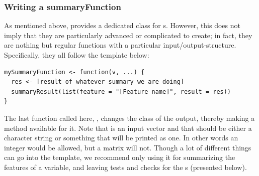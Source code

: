 \documentclass[article,shortnames]{jss}
\newcommand{\hl}[1]{\textcolor{magenta}{#1}}
\begin{document}

\subsubsection{Writing a summaryFunction}
As mentioned above,  provides a dedicated class for
s. However, this does not imply that they are
particularly advanced or complicated to create; in fact, they are
nothing but regular functions with a particular
input/output-structure. Specifically, they all follow the template
below:
\begin{Verbatim}
mySummaryFunction <- function(v, ...) {
  res <- [result of whatever summary we are doing]
  summaryResult(list(feature = "[Feature name]", result = res))
}
\end{Verbatim}
The last function called here, , changes the
class of the output, thereby making a  method available
for it.  Note that  is an input vector and that 
should be either a character string or something that will be printed
as one. In other words an integer would be allowed, but a matrix will
not. Though a lot of different things can go into the
 template, we recommend only using it for
summarizing the features of a variable, and leaving tests and checks
for the s (presented below).
\end{document}
